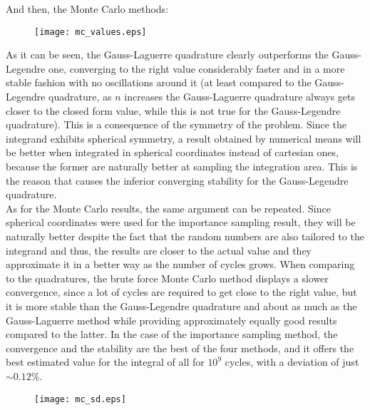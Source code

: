 \documentclass[11pt,a4paper,oneside]{article}
\begin{document}
		And then, the Monte Carlo methods:\\	
		
		\begin{figure}[ht!]\begin{center}\texttt{[image: mc\_values.eps]}\par\end{center}\protect\end{figure}\newpage
		
		As it can be seen, the Gauss-Laguerre quadrature clearly outperforms the Gauss-Legendre one, converging to the right value considerably faster and in a more stable fashion with no oscillations around it (at least compared to the Gauss-Legendre quadrature, as $n$ increases the Gauss-Laguerre quadrature always gets closer to the closed form value, while this is not true for the Gauss-Legendre quadrature). This is a consequence of the symmetry of the problem. Since the integrand exhibits spherical symmetry, a result obtained by numerical means will be better when integrated in spherical coordinates instead of cartesian ones, because the former are naturally better at sampling the integration area. This is the reason that causes the inferior converging stability for the Gauss-Legendre quadrature.\\
		
		As for the Monte Carlo results, the same argument can be repeated. Since spherical coordinates were used for the importance sampling result, they will be naturally better despite the fact that the random numbers are also tailored to the integrand and thus, the results are closer to the actual value and they approximate it in a better way as the number of cycles grows. When comparing to the quadratures, the brute force Monte Carlo method displays a slower convergence, since a lot of cycles are required to get close to the right value, but it is more stable than the Gauss-Legendre quadrature and about as much as the Gauss-Laguerre method while providing approximately equally good results compared to the latter. In the case of the importance sampling method, the convergence and the stability are the best of the four methods, and it offers the best estimated value for the integral of all for $10^9$ cycles, with a deviation of just $\sim0.12\%$.\\
		
		\begin{figure}[ht!]\begin{center}\texttt{[image: mc\_sd.eps]}\par\end{center}\protect\end{figure}\newpage
		
\end{document}
